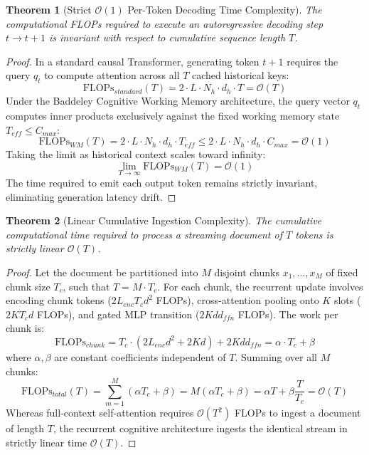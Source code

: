 \documentclass[11pt,a4paper]{article}
\newtheorem{theorem}{Theorem}
\begin{document}
\begin{theorem}[Strict $\mathcal{O}(1)$ Per-Token Decoding Time Complexity]
The computational FLOPs required to execute an autoregressive decoding step $t \to t+1$ is invariant with respect to cumulative sequence length $T$.
\end{theorem}
\begin{proof}
In a standard causal Transformer, generating token $t+1$ requires the query $q_t$ to compute attention across all $T$ cached historical keys:
\begin{equation}
\text{FLOPs}_{standard}(T) = 2 \cdot L \cdot N_h \cdot d_h \cdot T = \mathcal{O}(T)
\end{equation}
Under the Baddeley Cognitive Working Memory architecture, the query vector $q_t$ computes inner products exclusively against the fixed working memory state $T_{eff} \le C_{max}$:
\begin{equation}
\text{FLOPs}_{WM}(T) = 2 \cdot L \cdot N_h \cdot d_h \cdot T_{eff} \le 2 \cdot L \cdot N_h \cdot d_h \cdot C_{max} = \mathcal{O}(1)
\end{equation}
Taking the limit as historical context scales toward infinity:
\begin{equation}
\lim_{T \to \infty} \text{FLOPs}_{WM}(T) = \mathcal{O}(1)
\end{equation}
The time required to emit each output token remains strictly invariant, eliminating generation latency drift.
\end{proof}

\begin{theorem}[Linear Cumulative Ingestion Complexity]
The cumulative computational time required to process a streaming document of $T$ tokens is strictly linear $\mathcal{O}(T)$.
\end{theorem}
\begin{proof}
Let the document be partitioned into $M$ disjoint chunks $x_1, \dots, x_M$ of fixed chunk size $T_c$, such that $T = M \cdot T_c$. For each chunk, the recurrent update involves encoding chunk tokens ($2 L_{enc} T_c d^2$ FLOPs), cross-attention pooling onto $K$ slots ($2 K T_c d$ FLOPs), and gated MLP transition ($2 K d d_{ffn}$ FLOPs). The work per chunk is:
\begin{equation}
\text{FLOPs}_{chunk} = T_c \cdot (2 L_{enc} d^2 + 2 K d) + 2 K d d_{ffn} = \alpha \cdot T_c + \beta
\end{equation}
where $\alpha, \beta$ are constant coefficients independent of $T$. Summing over all $M$ chunks:
\begin{equation}
\text{FLOPs}_{total}(T) = \sum_{m=1}^M (\alpha T_c + \beta) = M (\alpha T_c + \beta) = \alpha T + \beta \frac{T}{T_c} = \mathcal{O}(T)
\end{equation}
Whereas full-context self-attention requires $\mathcal{O}(T^2)$ FLOPs to ingest a document of length $T$, the recurrent cognitive architecture ingests the identical stream in strictly linear time $\mathcal{O}(T)$.
\end{proof}
\end{document}
